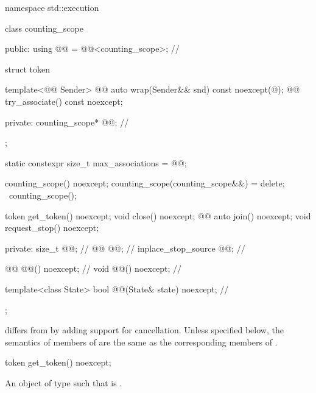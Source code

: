 %
%
\begin{codeblock}
namespace std::execution {
  class counting_scope {
  public:
    using @@ = @@<counting_scope>;      // \expos

    struct token {
      template<@@ Sender>
        @@ auto wrap(Sender&& snd) const noexcept(@\seebelow@);
      @@ try_associate() const noexcept;

    private:
      counting_scope* @@;                            // \expos
    };

    static constexpr size_t max_associations = @@;

    counting_scope() noexcept;
    counting_scope(counting_scope&&) = delete;
    ~counting_scope();

    token get_token() noexcept;
    void close() noexcept;
    @@ auto join() noexcept;
    void request_stop() noexcept;

  private:
    size_t @@;                                       // \expos
    @@ @@;                             // \expos
    inplace_stop_source @@;                       // \expos

    @@ @@() noexcept;                   // \expos
    void @@() noexcept;                       // \expos

    template<class State>
      bool @@(State& state) noexcept;    // \expos
  };
}
\end{codeblock}

\pnum
{} differs from  by
adding support for cancellation.
Unless specified below, the semantics of members of 
are the same as the corresponding members of .

%
\begin{itemdecl}
token get_token() noexcept;
\end{itemdecl}

\begin{itemdescr}
\pnum
\returns
An object  of type  such that
 is .
\end{itemdescr}

